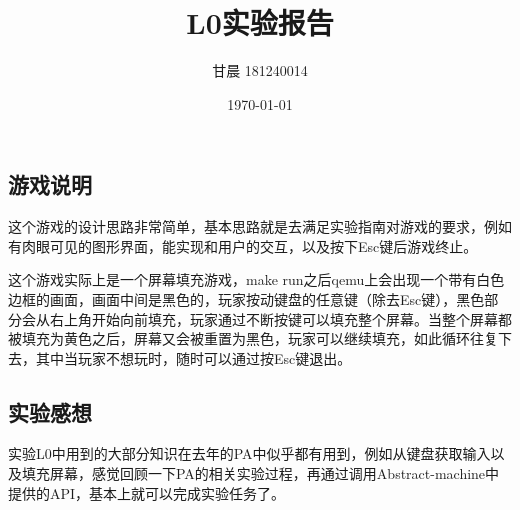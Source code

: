 \documentclass[UTF8]{ctexart}
\title{L0实验报告}
\author{甘晨 181240014}
\date{\today}
\begin{document}
\maketitle
\subsection{游戏说明}
这个游戏的设计思路非常简单，基本思路就是去满足实验指南对游戏的要求，例如有肉眼可见的图形界面，能实现和用户的交互，以及按下Esc键后游戏终止。

这个游戏实际上是一个屏幕填充游戏，make run之后qemu上会出现一个带有白色边框的画面，画面中间是黑色的，玩家按动键盘的任意键（除去Esc键），黑色部分会从右上角开始向前填充，玩家通过不断按键可以填充整个屏幕。当整个屏幕都被填充为黄色之后，屏幕又会被重置为黑色，玩家可以继续填充，如此循环往复下去，其中当玩家不想玩时，随时可以通过按Esc键退出。
\subsection{实验感想}
实验L0中用到的大部分知识在去年的PA中似乎都有用到，例如从键盘获取输入以及填充屏幕，感觉回顾一下PA的相关实验过程，再通过调用Abstract-machine中提供的API，基本上就可以完成实验任务了。
\end{document}
